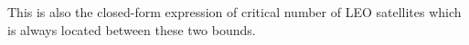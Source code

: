 \documentclass[final]{IEEEtran}
\begin{document}
This is also the closed-form expression of critical number of LEO satellites which is always located between these two bounds. %
\end{document}
